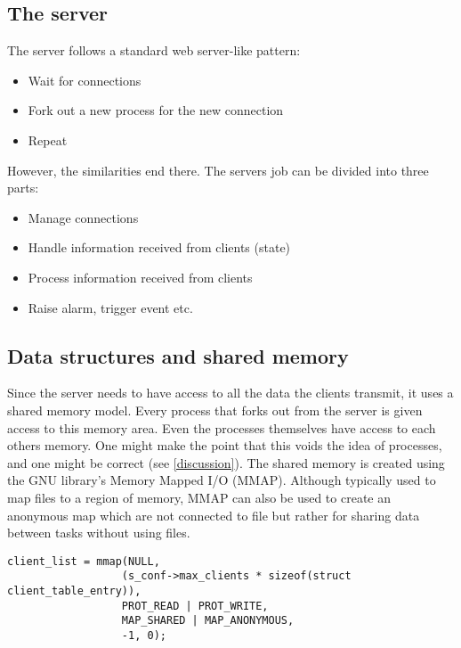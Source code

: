 \documentclass[12pt,english,a4paper]{report}
\begin{document}
\subsection{The server}
The server follows a standard web server-like pattern:
\begin{itemize}
  \item Wait for connections
  \item Fork out a new process for the new connection
  \item Repeat
\end{itemize}
However, the similarities end there. The servers job can be divided into three parts:
\begin{itemize}
  \item Manage connections
  \item Handle information received from clients (state)
  \item Process information received from clients
  \item Raise alarm, trigger event etc.
\end{itemize}

\subsection{Data structures and shared memory}
Since the server needs to have access to all the data the clients transmit, it uses a shared memory model. Every process that forks out from the server is given access to this memory area. Even the processes themselves have access to each others memory. One might make the point that this voids the idea of processes, and one might be correct (see \ref{discussion}). The shared memory is created using the GNU library's Memory Mapped I/O (MMAP). Although typically used to map files to a region of memory, MMAP can also be used to create an anonymous map which are not connected to file but rather for sharing data between tasks without using files.

\begin{lstlisting}
client_list = mmap(NULL, 
                  (s_conf->max_clients * sizeof(struct client_table_entry)), 
                  PROT_READ | PROT_WRITE,
                  MAP_SHARED | MAP_ANONYMOUS,
                  -1, 0);
\end{lstlisting}
\end{document}
